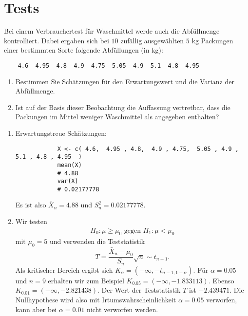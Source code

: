 \section{Tests}


 Bei einem Verbrauchertest für Waschmittel werde auch 
die Abfüllmenge kontrolliert. Dabei ergaben sich bei $10$ zufällig ausgewählten $5$ kg
Packungen einer bestimmten Sorte folgende Abfüllungen (in kg):
\begin{lstlisting}
    4.6  4.95  4.8  4.9  4.75  5.05  4.9  5.1  4.8  4.95
\end{lstlisting}
\begin{enumerate}
    \item Bestimmen Sie Schätzungen für den Erwartungswert und die Varianz 
        der Abfüllmenge.
    \item Ist auf der Basis dieser Beobachtung die Auffassung vertretbar, 
        dass die Packungen im Mittel weniger Waschmittel als angegeben enthalten?
\end{enumerate}

\solution
\begin{enumerate}
    \item Erwartungstreue Schätzungen:
        \begin{lstlisting}
            X <- c( 4.6,  4.95 , 4.8,  4.9 , 4.75,  5.05 , 4.9 , 5.1 , 4.8 , 4.95  )
            mean(X)
            # 4.88
            var(X)
            # 0.02177778
        \end{lstlisting}
        Es ist also $\bar X_n= 4.88$ und $S^2_n = 0.02177778$.
    \item Wir testen
        \begin{align*}
            H_0: \mu \geq \mu_0 \text{ gegen } H_1: \mu < \mu_0
        \end{align*}
        mit $\mu_0=5$ und verwenden die Teststatistik
        \begin{equation*}
            T = \frac{\bar X_n - \mu_0}{ S_n } \sqrt{n} \sim t_{n-1}.
        \end{equation*}
        Als kritischer Bereich ergibt sich $K_{\alpha} = ( -\infty, -t_{n-1,
        1-\alpha})$.  Für $\alpha = 0.05$ und $n=9$ erhalten wir zum Beispiel
        $K_{0.05} = (-\infty, -1.833113)$. Ebenso $K_{0.01} = (-\infty,
        -2.821438 )$.  Der Wert der Teststatistik $T$ ist $-2.439471$. Die
        Nullhypothese wird also mit Irtumswahrscheinlichkeit $\alpha=0.05$
        verworfen, kann aber bei $\alpha=0.01$ nicht verworfen werden. 
\end{enumerate}

